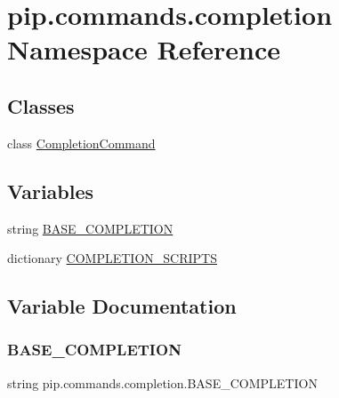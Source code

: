 \hypertarget{namespacepip_1_1commands_1_1completion}{}\section{pip.\+commands.\+completion Namespace Reference}
\label{namespacepip_1_1commands_1_1completion}
\subsection*{Classes}
\begin{DoxyCompactItemize}
\item 
class \hyperlink{classpip_1_1commands_1_1completion_1_1_completion_command}{Completion\+Command}
\end{DoxyCompactItemize}
\subsection*{Variables}
\begin{DoxyCompactItemize}
\item 
string \hyperlink{namespacepip_1_1commands_1_1completion_a42d3677e84c4947181459d09f40e8ef0}{B\+A\+S\+E\+\_\+\+C\+O\+M\+P\+L\+E\+T\+I\+ON}
\item 
dictionary \hyperlink{namespacepip_1_1commands_1_1completion_a06feac68c13597ec3fa108ed320b24ab}{C\+O\+M\+P\+L\+E\+T\+I\+O\+N\+\_\+\+S\+C\+R\+I\+P\+TS}
\end{DoxyCompactItemize}


\subsection{Variable Documentation}
\mbox{\label{namespacepip_1_1commands_1_1completion_a42d3677e84c4947181459d09f40e8ef0}} 
\subsubsection{\texorpdfstring{B\+A\+S\+E\+\_\+\+C\+O\+M\+P\+L\+E\+T\+I\+ON}{BASE\_COMPLETION}}
{\footnotesize\ttfamily string pip.\+commands.\+completion.\+B\+A\+S\+E\+\_\+\+C\+O\+M\+P\+L\+E\+T\+I\+ON}

